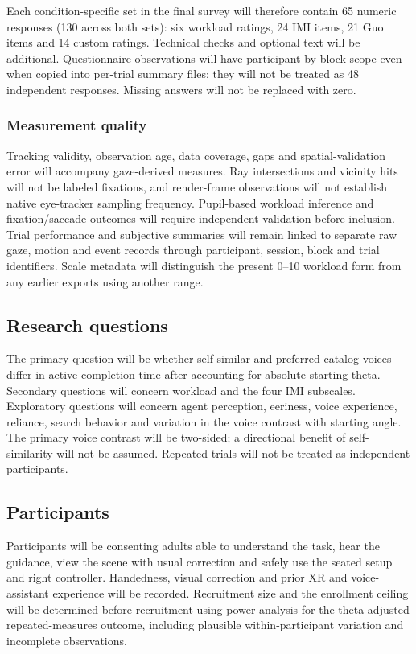 \documentclass[11pt,letterpaper]{article}
\begin{document}
Each condition-specific set in the final survey will therefore contain 65 numeric responses (130 across both sets): six workload ratings, 24 IMI items, 21 Guo items and 14 custom ratings. Technical checks and optional text will be additional. Questionnaire observations will have participant-by-block scope even when copied into per-trial summary files; they will not be treated as 48 independent responses. Missing answers will not be replaced with zero.

\subsubsection{Measurement quality}
Tracking validity, observation age, data coverage, gaps and spatial-validation error will accompany gaze-derived measures. Ray intersections and vicinity hits will not be labeled fixations, and render-frame observations will not establish native eye-tracker sampling frequency. Pupil-based workload inference and fixation/saccade outcomes will require independent validation before inclusion. Trial performance and subjective summaries will remain linked to separate raw gaze, motion and event records through participant, session, block and trial identifiers. Scale metadata will distinguish the present 0--10 workload form from any earlier exports using another range.

\subsection{Research questions}
The primary question will be whether self-similar and preferred catalog voices differ in active completion time after accounting for absolute starting theta. Secondary questions will concern workload and the four IMI subscales. Exploratory questions will concern agent perception, eeriness, voice experience, reliance, search behavior and variation in the voice contrast with starting angle. The primary voice contrast will be two-sided; a directional benefit of self-similarity will not be assumed. Repeated trials will not be treated as independent participants.

\subsection{Participants}
Participants will be consenting adults able to understand the task, hear the guidance, view the scene with usual correction and safely use the seated setup and right controller. Handedness, visual correction and prior XR and voice-assistant experience will be recorded. Recruitment size and the enrollment ceiling will be determined before recruitment using power analysis for the theta-adjusted repeated-measures outcome, including plausible within-participant variation and incomplete observations.
\end{document}
